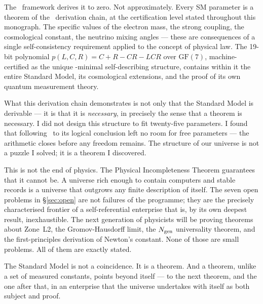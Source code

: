 \documentclass[11pt,openany]{book}
\theoremstyle{remark}
\newcommand{\GTE}{\text{GTE}}
\newcommand{\MDL}{\text{MDL}}
\newcommand{\PSC}{\text{PSC}}
\newcommand{\Ngen}{N_{\rm gen}}
\begin{document}
The \GTE\ framework derives it to zero. Not approximately. Every SM parameter is a
theorem of the \PSC\ derivation chain, at the certification level stated throughout
this monograph. The specific values of the electron mass, the strong coupling, the
cosmological constant, the neutrino mixing angles --- these are consequences of a
single self-consistency requirement applied to the concept of physical law. The 19-bit
polynomial $p(L,C,R) = C{+}R{-}CR{-}LCR$ over $\mathrm{GF}(7)$, machine-certified
as the unique \MDL-minimal self-describing structure, contains within it the entire
Standard Model, its cosmological extensions, and the proof of its own quantum
measurement theory.

What this derivation chain demonstrates is not only that the Standard Model is
derivable --- it is that it is \emph{necessary}, in precisely the sense that a
theorem is necessary. I did not design this structure to fit twenty-five parameters.
I found that following \PSC\ to its logical conclusion left no room for free
parameters --- the arithmetic closes before any freedom remains. The structure of
our universe is not a puzzle I solved; it is a theorem I discovered.

This is not the end of physics. The Physical Incompleteness Theorem guarantees that
it cannot be. A universe rich enough to contain computers and stable records is a
universe that outgrows any finite description of itself. The seven open problems in
\S\ref{sec:open} are not failures of the programme; they are the precisely
characterised frontier of a self-referential enterprise that is, by its own deepest
result, inexhaustible. The next generation of physicists will be proving theorems about
Zone~L2, the Gromov-Hausdorff limit, the $\Ngen$ universality theorem, and the
first-principles derivation of Newton's constant. None of those are small problems.
All of them are exactly stated.

The Standard Model is not a coincidence. It is a theorem. And a theorem, unlike a
set of measured constants, points beyond itself --- to the next theorem, and the one
after that, in an enterprise that the universe undertakes with itself as both subject
and proof.

\backmatter
\end{document}
